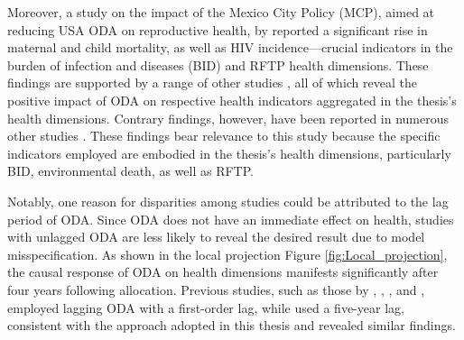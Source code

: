 Moreover, a study on the impact of the Mexico City Policy (MCP), aimed at reducing USA ODA on reproductive health, by \textcite{kavakli_us_2022} reported a significant rise in maternal and child mortality, as well as HIV incidence—crucial indicators in the burden of infection and diseases (BID) and RFTP health dimensions. These findings are supported by a range of other studies \parencite{akinola_foreign_2022, muhammad_health_2021, yogo_health_2015}, all of which reveal the positive impact of ODA on respective health indicators aggregated in the thesis's health dimensions. Contrary findings, however, have been reported in numerous other studies \parencite{williamson_foreign_2008, nwude_official_2020, bavinger_relationship_2017, toseef_how_2019}. These findings bear relevance to this study because the specific indicators employed are embodied in the thesis's health dimensions, particularly BID, environmental death, as well as RFTP.

Notably, one reason for disparities among studies could be attributed to the lag period of ODA. Since ODA does not have an immediate effect on health, studies with unlagged ODA are less likely to reveal the desired result due to model misspecification. As shown in the local projection Figure \ref{fig:Local_projection}, the causal response of ODA on health dimensions manifests significantly after four years following allocation. Previous studies, such as those by \textcite{kavanagh_governance_2019}, \textcite{kavakli_us_2022}, \textcite{chung_economic_2022}, and \textcite{akinola_foreign_2022}, employed lagging ODA with a first-order lag, while \textcite{doucouliagos_health_2021} used a five-year lag, consistent with the approach adopted in this thesis and revealed similar findings.

